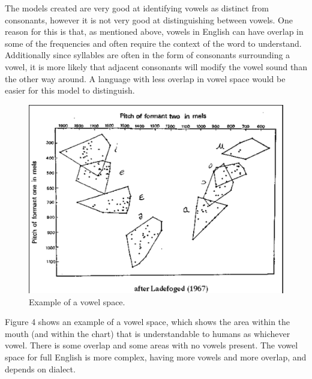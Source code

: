 \documentclass[10pt,twocolumn]{article}
\begin{document}
The models created are very good at identifying vowels as distinct from consonants, however it is not very good at distinguishing between vowels. One reason for this is that, as mentioned above, vowels in English can have overlap in some of the frequencies and often require the context of the word to understand. Additionally since syllables are often in the form of consonants surrounding a vowel, it is more likely that adjacent consonants will modify the vowel sound than the other way around. A language with less overlap in vowel space would be easier for this model to distinguish. 

\begin{figure}
    \centering
    \includegraphics[width=.95\linewidth]{vowel_space.png}
    \caption{
        Example of a vowel space.
    }
    \label{fig:first-page}
\end{figure}

Figure 4 shows an example of a vowel space, which shows the area within the mouth (and within the chart) that is understandable to humans as whichever vowel. There is some overlap and some areas with no vowels present. The vowel space for full English is more complex, having more vowels and more overlap, and depends on dialect.
\end{document}
